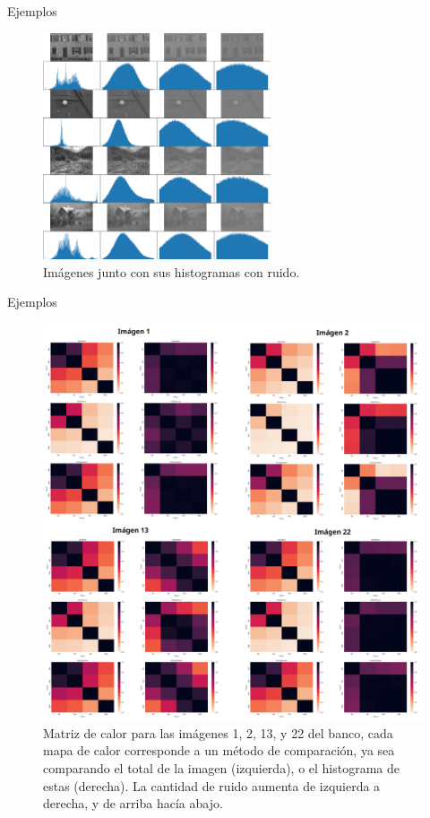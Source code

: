 \documentclass{beamer}
\begin{document}
\begin{frame}{Ejemplos}
    \begin{figure}[H]
        \centering
        \includegraphics[width=0.6\textwidth]{img_hist_noise.png}
        \caption{Imágenes junto con sus histogramas con ruido.}
    \end{figure}
\end{frame}

\begin{frame}{Ejemplos}
    \begin{figure}[H]
        \centering
        \includegraphics[width=\textwidth]{heatmap_all.png}
        \caption{Matriz de calor para las im\'agenes 1, 2, 13, y 22 del banco, cada mapa de calor corresponde a un m\'etodo de comparaci\'on, ya sea comparando el total de la imagen (izquierda), o el histograma de estas (derecha). La cantidad de ruido aumenta de izquierda a derecha, y de arriba hacía abajo.}
        \label{fig:heatmapall}
    \end{figure}
\end{frame}
\end{document}

